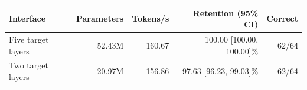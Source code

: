 \begin{tabular}{lrrrr}
\toprule
Interface & Parameters & Tokens/s & Retention (95\% CI) & Correct \\
\midrule
Five target layers & 52.43M & 160.67 & 100.00 [100.00, 100.00]\% & 62/64 \\
Two target layers & 20.97M & 156.86 & 97.63 [96.23, 99.03]\% & 62/64 \\
\bottomrule
\end{tabular}

